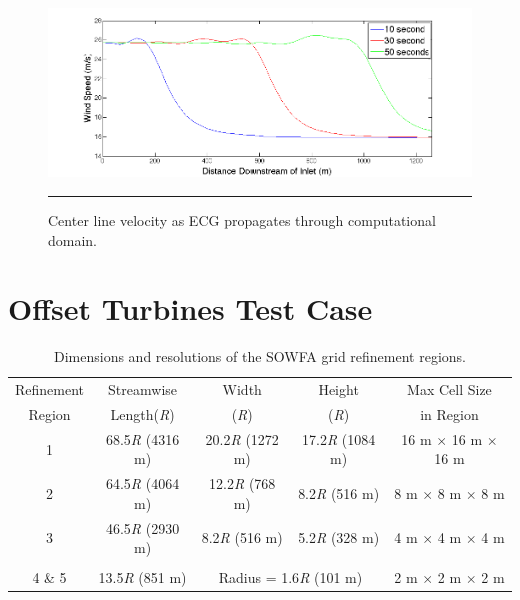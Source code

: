 \begin{figure}[htbp] \label{fig6-12}
	\centering
		\includegraphics[trim = {1cm 0 2cm 0}, clip, width = \linewidth]{Figures/ch6Figures/fig6-12.png}
		\rule{35em}{0.5pt}
	\caption{Center line velocity as ECG propagates through computational domain.}
\end{figure}



\section{Offset Turbines Test Case} \label{section6-6}


\begin{table} \label{Table6-1}
\centering
\caption{ Dimensions and resolutions of the SOWFA grid refinement regions.}
\begin{tabular}{c c c c c}
\hline
Refinement & Streamwise  & Width & Height & Max Cell Size\\
Region & Length(\emph{R}) & (\emph{R})  &  (\emph{R}) & in Region\\
\hline
1 & 68.5\emph{R} (4316 m)  & 20.2\emph{R} (1272 m) & 17.2\emph{R} (1084 m) & 16 m $\times$ 16 m $\times$ 16 m\\
2 & 64.5\emph{R} (4064 m)  & 12.2\emph{R} (768 m) & 8.2\emph{R} (516 m)  & 8 m $\times$ 8 m $\times$ 8 m\\
3 & 46.5\emph{R} (2930 m)  & 8.2\emph{R} (516 m) & 5.2\emph{R} (328 m)  & 4 m $\times$ 4 m $\times$ 4 m\\
\\
4 \& 5 & 13.5\emph{R} (851 m)    & \multicolumn{2}{c}{Radius = 1.6\emph{R} (101 m)}   & 2 m $\times$ 2 m $\times$ 2 m\\
\hline
\end{tabular}
\end{table}

